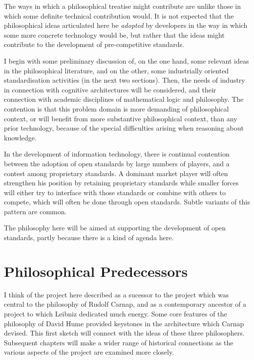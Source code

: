 The ways in which a philosophical treatise might contribute are unlike those in
which some definite technical contribution would.
It is not expected that the philosophical ideas articulated here be {\it adopted} by developers
in the way in which some more concrete technology would be, but rather that
the ideas might contribute to the development of pre-competitive standards.

I begin with some preliminary discussion of, on the one hand, some relevant
ideas in the philosophical literature, and on the other, some industrially
oriented standardisation activities (in the next two sections).
Then, the needs of industry in connection with cognitive architectures will
be considered, and their connection with academic disciplines of mathematical
logic and philosophy.
The contention is that this problem domain is more demanding of philosophical
context, or will benefit from more substantive philosophical context, than any
 prior technology, because of the special difficulties arising when reasoning
about knowledge.

In the development of information technology, there is continual contention between
the adoption of open standards by large numbers of players, and a contest among
proprietary standards.
A dominant market player will often strengthen his position by retaining proprietary
standards while smaller forces will either try to interface with those standards
or combine with others to compete, which will often be done through open standards.
Subtle variants of this pattern are common.

The philosophy here will be aimed at supporting the development of open standards,
partly because there is a kind of agenda here.

\section{Philosophical Predecessors}

I think of the project here described as a sucessor to the project which
was central to the philosophy of Rudolf Carnap, and as a contemporary ancestor
of a project to which Leibniz dedicated much energy.
Some core features of the philosophy of David Hume provided keystones in
the architecture which Carnap devised.
This first sketch will connect with the ideas of these three philosophers.
Subsequent chapters will make a wider range of historical connections
as the various aspects of the project are examined more closely.

